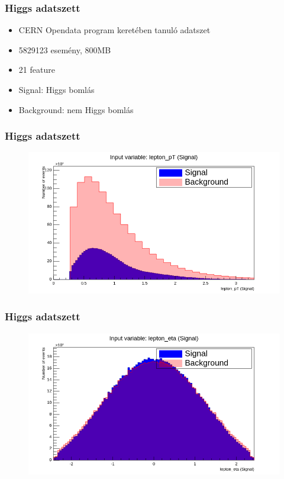 \documentclass{beamer}
\begin{document}
\begin{frame}
\frametitle{Higgs adatszett}
\begin{itemize}
  \setlength{\itemsep}{18pt}
  \item CERN Opendata program keretében tanuló adatszet
  \item 5829123 esemény, 800MB
  \item 21 feature
  \item Signal: Higgs bomlás
  \item Background: nem Higgs bomlás
\end{itemize}
\end{frame}

\begin{frame}
\frametitle{Higgs adatszett}
\begin{figure}[H]
	\centering
    	\includegraphics[width=\textwidth]{pic/higgs/1}
\end{figure}
\end{frame}
\begin{frame}
\frametitle{Higgs adatszett}
\begin{figure}[H]
	\centering
    	\includegraphics[width=\textwidth]{pic/higgs/3}
\end{figure}
\end{frame}
\end{document}
